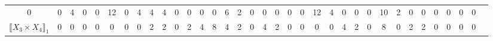 \documentclass[12pt]{article}
\theoremstyle{definition}
\theoremstyle{remark}
\begin{document}
{\begin{table}[H]
\begin{adjustbox}{angle=90}
{\begin{tabular}{c||c|c|c|c|c|c|c|c|c|c|c|c|c|c|c|c|c|c|c|c|c|c|c|c|c|c|c|c|c|c|c|c|c|c}
0  & %
0  & %
4  & %
0  & %
0  & %
12  & %
0  & %
4  & %
4  & %
4  & %
0  & %
0  & %
0  & %
0  & %
6  & %
2  & %
0  & %
0  & %
0  & %
0  & %
0  & %
12  & %
4  & %
0  & %
0  & %
0  & %
10  & %
2  & %
0  & %
0  & %
0  & %
0  & %
0  & %
0   %
\\
$\llbracket X_3 \times X_4 \rrbracket_1$ &
0  & %
0  & %
0  & %
0  & %
0  & %
0  & %
0  & %
2  & %
2  & %
0  & %
2  & %
4  & %
8  & %
4  & %
2  & %
0  & %
4  & %
2  & %
0  & %
0  & %
0  & %
0  & %
4  & %
2  & %
0  & %
8  & %
0  & %
2  & %
2  & %
0  & %
0  & %
0  & %
0  & %

\end{tabular}}
\end{adjustbox}
\end{table}}
\end{document}

